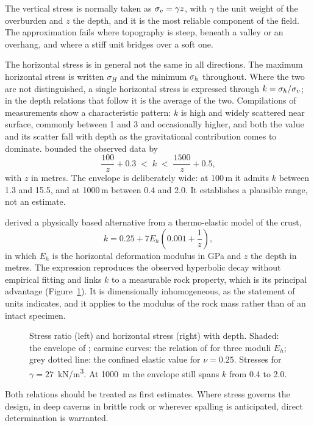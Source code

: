 The vertical stress is normally taken as $\sigma_v = \gamma z$, with $\gamma$ the
unit weight of the overburden and $z$ the depth, and it is the most
reliable component of the field. The approximation fails where topography is
steep, beneath a valley or an overhang, and where a stiff unit bridges over a
soft one.

The horizontal stress is in general not the same in all directions. The
maximum horizontal stress is written $\sigma_H$ and the minimum $\sigma_h$
throughout. Where the two are not distinguished, a single horizontal stress is
expressed through $k = \sigma_h / \sigma_v$; in the depth relations that follow it is
the average of the two. Compilations of
measurements show a characteristic pattern: $k$ is high and widely scattered
near surface, commonly between 1 and 3 and occasionally higher, and both the
value and its scatter fall with depth as the gravitational contribution comes
to dominate.
\citet{hoekbrown1980underground} bounded the observed data by
\[
\frac{100}{z} + 0.3 \;<\; k \;<\; \frac{1500}{z} + 0.5,
\]
with $z$ in metres. The envelope is deliberately wide: at 100\,m it
admits $k$ between 1.3 and 15.5, and at 1000\,m between 0.4 and 2.0. It
establishes a plausible range, not an estimate.

\citet{sheorey1994theory} derived a physically based alternative from
a thermo-elastic model of the crust,
\[
k = 0.25 + 7 E_h \left( 0.001 + \frac{1}{z} \right),
\]
in which $E_h$ is the horizontal deformation modulus in \si{\giga\pascal} and
$z$ the depth in metres. The expression reproduces the observed hyperbolic
decay without empirical fitting and links $k$ to a measurable rock property,
which is its principal advantage (Figure~\ref{fig:k-depth-envelope}). It is
dimensionally inhomogeneous, as the
statement of units indicates, and it applies to the modulus of the rock mass
rather than of an intact specimen.

\begin{figure}[htbp]
\centering
{}
\caption{Stress ratio (left) and horizontal stress (right) with depth. Shaded: the envelope of \citet{hoekbrown1980underground}; carmine curves: the relation of \citet{sheorey1994theory} for three moduli $E_h$; grey dotted line: the confined elastic value for $\nu = 0.25$. Stresses for $\gamma = 27$~kN/m\textsuperscript{3}. At 1000~m the envelope still spans $k$ from 0.4 to 2.0.}
\label{fig:k-depth-envelope}
\end{figure}

Both relations should be treated as first estimates. Where stress governs the
design, in deep caverns in brittle rock or wherever spalling is anticipated,
direct determination is warranted.

